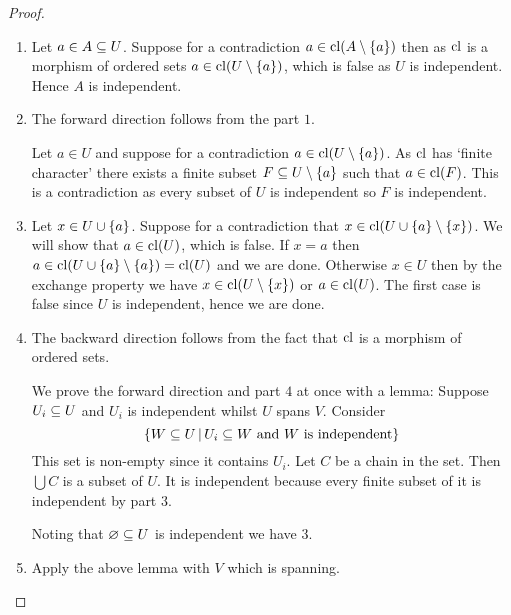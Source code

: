 \begin{proof}~
    \begin{enumerate}
        \item Let $a \in A \subseteq U$. 
        Suppose for a contradiction 
        $a \in \operatorname{cl}(A \setminus \left\{a\right\})$ then as $\operatorname{cl}$ is a morphism of 
        ordered sets $a \in \operatorname{cl}(U \setminus \left\{a\right\})$, 
        which is false as $U$ is independent.
        Hence $A$ is independent.
        \item The forward direction follows from the part $1$. 
        
        \begin{backward}
            Let $a \in U$ and suppose for a contradiction 
            $a \in \operatorname{cl}(U \setminus \left\{a\right\})$. 
            As $\operatorname{cl}$ has `finite character' there exists a finite subset 
            $F \subseteq U \setminus \left\{a\right\}$ such that $a \in \operatorname{cl}(F)$.
            This is a contradiction as every subset of $U$ is independent
            so $F$ is independent.
        \end{backward}

        \item Let $x \in U \cup \left\{a\right\}$.
        Suppose for a contradiction that 
        $x \in \operatorname{cl}(U \cup \left\{a\right\} \setminus \left\{x\right\})$.
        We will show that $a \in \operatorname{cl}(U)$, which is false.
        If $x = a$ then $a \in \operatorname{cl}(U \cup \left\{a\right\} \setminus \left\{a\right\}) = \operatorname{cl}(U)$
        and we are done.
        Otherwise $x \in U$ then by the exchange property
        we have $x \in \operatorname{cl}(U \setminus \left\{x\right\})$ or $a \in \operatorname{cl}(U)$.
        The first case is false since $U$ is independent,
        hence we are done.

        \item The backward direction follows from the fact that 
        $\operatorname{cl}$ is a morphism of ordered sets.

        We prove the forward direction and part $4$ at once with a lemma:
        Suppose $U_i \subseteq U$ and $U_i$ is independent whilst 
        $U$ spans $V$. Consider 
        \[
            \left\{W \subseteq U \,|\, U_i \subseteq W \text{ and } 
            W \text{ is independent}\right\}
        \]
        This set is non-empty since it contains $U_i$.
        Let $C$ be a chain in the set. 
        Then $\bigcup C$ is a subset of $U$.
        It is independent because every finite subset of it is independent
        by part $3$.

        Noting that $\varnothing \subseteq U$ is independent we have $3$.

        \item Apply the above lemma with $V$ which is spanning.


\end{enumerate}
\end{proof}
